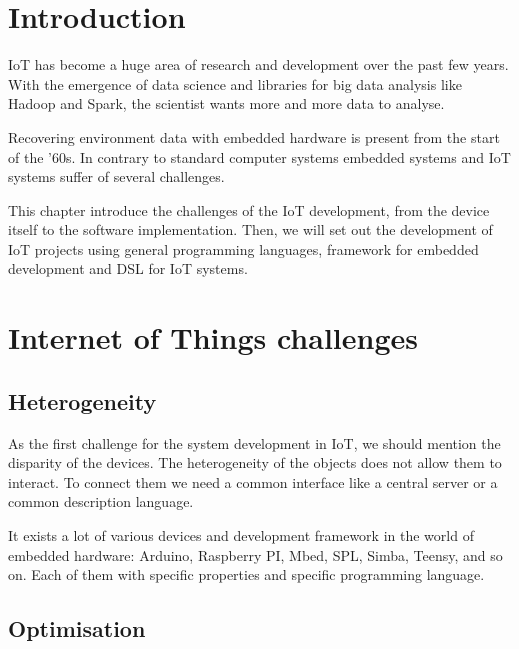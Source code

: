 \label{cha:iot_challenge}

\section{Introduction}
\label{sec:iot_challenge_intro}

\gls{IoT} has become a huge area of research and development over the past few
years. With the emergence of data science and libraries for big data analysis
like \gls{Hadoop} and \gls{Spark}, the scientist wants more and more data to
analyse.

Recovering environment data with embedded hardware is present from the start of
the ’60s\cite{Community2017}. In contrary to standard computer systems embedded
systems and \gls{IoT} systems suffer of several challenges.

This chapter introduce the challenges of the \gls{IoT} development, from the device
itself to the software implementation. Then, we will set out the development of
\gls{IoT} projects using general programming languages, framework for embedded
development and \gls{DSL} for \gls{IoT} systems.

\section{Internet of Things challenges}
\label{sec:iot_challenges}

\subsection{Heterogeneity}
\label{sec:heterogeneity}

As the first challenge for the system development in \gls{IoT}, we should
mention the disparity of the devices. The heterogeneity of the objects does not
allow them to interact. \cite{midgar} To connect them we need a
common interface like a central server or a common description language.

It exists a lot of various devices and development framework in the world of
embedded hardware: Arduino, Raspberry PI, Mbed, SPL, Simba, Teensy, and so
on. Each of them with specific properties and specific programming language.

\subsection{Optimisation}
\label{sec:iot_challenge_optimisation}

